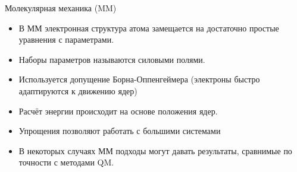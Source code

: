 \begin{frame}{Молекулярная механика (MM)}{}
 \begin{itemize}
  \item
  В ММ электронная структура атома замещается на достаточно простые уравнения с параметрами.
\vspace{0.2cm}
  \item
   Наборы параметров называются силовыми полями.
\vspace{0.2cm}
  \item
      Используется допущение Борна-Оппенгеймера (электроны быстро адаптируются к движению ядер)
\vspace{0.2cm}
  \item
	 Расчёт энергии происходит на основе положения ядер.
\vspace{0.2cm}
  \item
	  Упрощения позволяют работать с большими системами
\vspace{0.2cm}
  \item
	   В некоторых случаях ММ подходы могут давать результаты, сравнимые по точности с методами QM.
\vspace{0.2cm}
 \end{itemize}
\end{frame}


